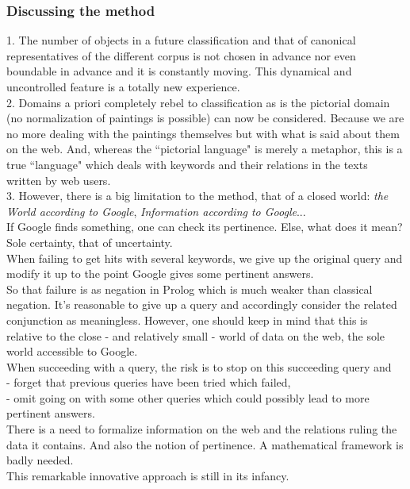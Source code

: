 \subsubsection{Discussing the method}
1. The number of objects in a future classification and that of
canonical representatives of the different corpus is not chosen
in advance nor even boundable in advance and it is constantly
moving.
This dynamical and uncontrolled feature is a totally new
experience.
\medskip\\
2. Domains a priori completely rebel to classification as is
the pictorial domain (no normalization of paintings is possible)
can now be considered.
Because we are no more dealing with the paintings themselves
but with what is said about them on the web.
And, whereas the ``pictorial language" is merely a metaphor,
this is a true ``language" which deals with keywords and their
relations in the texts written by web users.
\medskip\\
3. However, there is a big limitation to the method, that of
a closed world: {\em the World according to Google},
{\em Information according to Google}...
\\ If Google finds something, one can check its pertinence.
Else, what does it mean? Sole certainty, that of uncertainty.
\\
When failing to get hits with several keywords, we give up the
original query and modify it up to the point Google gives some
pertinent answers.
\\ So that failure is as negation in Prolog which is much weaker
than classical negation.
It's reasonable to give up a query and accordingly consider
the related conjunction as meaningless. However, one should keep
in mind that this is relative to the close
- and relatively small - world of data on the web,
the sole world accessible to Google.
\\
When succeeding with a query, the risk is to stop on this
succeeding query and
\\- forget that previous queries have been tried which failed,
\\- omit going on with some other queries which could possibly
lead to more pertinent answers.
\medskip\\
There is a need to formalize information on the web and the
relations ruling the data it contains. And also the notion
of pertinence. A mathematical framework is badly needed.
\\
This remarkable innovative approach is still in its infancy.
